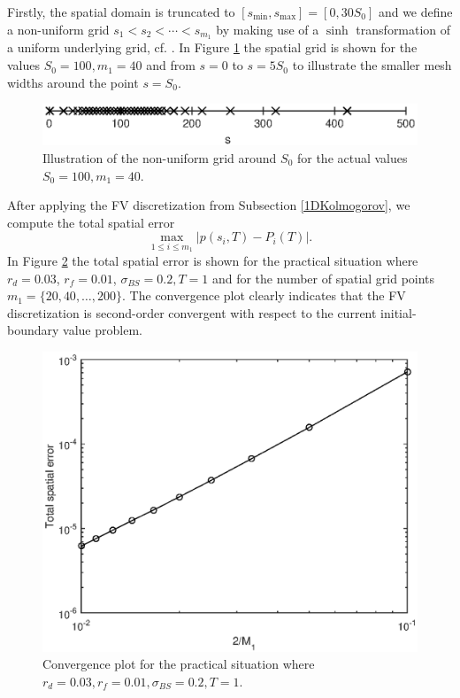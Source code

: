 \documentclass[10pt]{article}
\begin{document}
Firstly, the spatial domain is truncated to $[s_{\min}, s_{\max}] = [0, 30S_{0}]$ and we define a non-uniform grid $s_{1} < s_{2} < \cdots < s_{m_{1}}$ by making use of a $\sinh$ transformation of a uniform underlying grid, cf. \cite{IHF10}. In Figure \ref{fig:Grid1D} the spatial grid is shown for the values $S_{0}=100, m_{1} = 40$ and from $s=0$ to $s=5S_{0}$ to illustrate the smaller mesh widths around the point $s=S_{0}$.
\begin{figure}
\begin{center}
\includegraphics[scale=0.5]{Grid1D.eps}  
\caption{Illustration of the non-uniform grid around $S_{0}$ for the actual values $S_{0}=100, m_{1}=40$.}
\label{fig:Grid1D}
\end{center}
\end{figure}
After applying the FV discretization from Subsection \ref{1DKolmogorov}, we compute the total spatial error
$$ \max_{1 \le i \le m_{1}} \vert p(s_{i},T) - P_{i}(T) \vert. $$
In Figure \ref{fig:Convergence1D} the total spatial error is shown for the practical situation where $r_{d} = 0.03$, $r_{f} = 0.01$, $\sigma_{BS} = 0.2, T=1$ and for the number of spatial grid points $m_{1} = \{ 20, 40, \ldots, 200\}$. 
The convergence plot clearly indicates that the FV discretization is second-order convergent with respect to the current initial-boundary value problem.
\begin{figure}
\begin{center}
\includegraphics[scale=0.5]{Convergence1D.eps}  
\caption{Convergence plot for the practical situation where $r_{d} = 0.03, r_{f} = 0.01, \sigma_{BS} = 0.2, T=1$.}
\label{fig:Convergence1D}
\end{center}
\end{figure}
\end{document}
